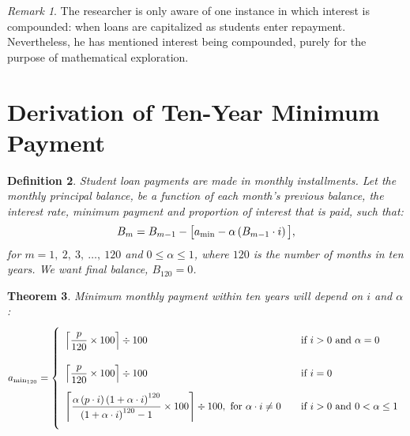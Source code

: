 \documentclass[12pt,letterpaper,oneside]{article}
\newtheorem{theorem}{Theorem}[section] %
\newtheorem{definition}[theorem]{Definition} %
\theoremstyle{remark} %
\newtheorem{remark}[theorem]{Remark}
\begin{document}
	\vspace{12pt}
	\begin{remark}
	The researcher is only aware of one instance in which interest is compounded: when loans are capitalized as students enter repayment.
	Nevertheless, he has mentioned interest being compounded, purely for the purpose of mathematical exploration.
	\end{remark}

	\newpage
	
\section{Derivation of Ten-Year Minimum Payment}

	\begin{definition}
	Student loan payments are made in monthly installments. Let the monthly principal balance, be a function of each month's previous balance, the interest rate, minimum payment and proportion of interest that is paid, such that:
	\begin{equation}
	B_{m}=B_{m-1}-\big[a_{\rm{min}}-\alpha\left(B_{m-1}\cdot i\right)\big],\label{eq}
	\end{equation}
	for $m=1,\ 2,\ 3,\ \dots,\ 120$ and $0\leq\alpha\leq1$, where $120$ is the number of months in ten years. 
	We want final balance, $B_{120}=0$.
	\end{definition}

	\renewcommand{\base}{\left(1+\alpha\cdot i\right)}
	\begin{theorem}
	Minimum monthly payment within ten years will depend on $i$ and $\alpha$:
	\small
	\[
	a_{\rm{min_{120}}}=
	\left\{
	\begin{array}{l l}
	\\[-6pt]
	\left\lceil{\dfrac{p}{120}\times 100}\right\rceil\div 100&\quad\mbox{if } i>0 \mbox{ and }\alpha=0\\[18pt]
	\left\lceil{\dfrac{p}{120}\times 100}\right\rceil\div 100&\quad\mbox{if } i=0\\[12pt]
	\left\lceil{\dfrac{\alpha\left(p\cdot i\right)\base^{120}}{\base^{120}-1}\times 100}\right\rceil\div 100,\mbox{ for }\alpha\cdot i\neq 0 &\quad\mbox{if } i>0\mbox{ and }0<\alpha\leq1
	\\[18pt]
	\end{array}
	\right. 
	\]
	\end{theorem}

	\renewcommand{\bo}{p\left(1+\alpha\cdot i\right)-a_{\rm{min}}}
	\newcommand{\bt}{p\left(1+\alpha\cdot i\right)^{2}-\left(1+\alpha\cdot i\right)a_{\rm{min}}-a_{\rm{min}}}
	\renewcommand{\base}{\left(1+\alpha\cdot i\right)} %
\end{document}
